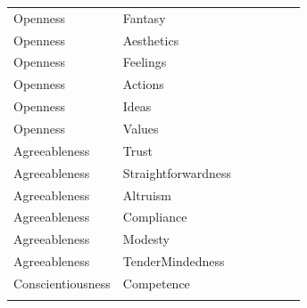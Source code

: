 \documentclass{article}\usepackage[]{graphicx}\usepackage[]{color}
\begin{document}
\begin{table}
\begin{tabular}[t]{lllllll}
Openness & Fantasy & \cellcolor{white}{0.4} & \cellcolor{white}{0.05} & \cellcolor{white}{-0.08} & \cellcolor{white}{0.06} & \cellcolor{yellow}{0.69}\\
Openness & Aesthetics & \cellcolor{white}{0.14} & \cellcolor{white}{0.25} & \cellcolor{white}{0.05} & \cellcolor{white}{0.16} & \cellcolor{yellow}{0.69}\\
Openness & Feelings & \cellcolor{yellow}{0.59} & \cellcolor{white}{0.3} & \cellcolor{white}{0.28} & \cellcolor{white}{-0.11} & \cellcolor{yellow}{0.57}\\
\addlinespace
Openness & Actions & \cellcolor{white}{0.43} & \cellcolor{white}{-0.05} & \cellcolor{white}{-0.12} & \cellcolor{white}{0.14} & \cellcolor{yellow}{0.61}\\
Openness & Ideas & \cellcolor{white}{0.13} & \cellcolor{white}{-0.1} & \cellcolor{white}{0.2} & \cellcolor{white}{-0.01} & \cellcolor{yellow}{0.66}\\
Openness & Values & \cellcolor{white}{0.34} & \cellcolor{white}{0.22} & \cellcolor{white}{0.06} & \cellcolor{white}{0.14} & \cellcolor{yellow}{0.65}\\
Agreeableness & Trust & \cellcolor{yellow}{0.54} & \cellcolor{white}{0.01} & \cellcolor{white}{0.26} & \cellcolor{white}{0.44} & \cellcolor{white}{0.28}\\
Agreeableness & Straightforwardness & \cellcolor{white}{0.22} & \cellcolor{white}{0.27} & \cellcolor{white}{0.38} & \cellcolor{yellow}{0.52} & \cellcolor{white}{0.08}\\
\addlinespace
Agreeableness & Altruism & \cellcolor{yellow}{0.71} & \cellcolor{white}{0.16} & \cellcolor{white}{0.44} & \cellcolor{white}{0.41} & \cellcolor{white}{0.35}\\
Agreeableness & Compliance & \cellcolor{white}{0.25} & \cellcolor{white}{0.16} & \cellcolor{white}{0.15} & \cellcolor{yellow}{0.76} & \cellcolor{white}{0.28}\\
Agreeableness & Modesty & \cellcolor{white}{0.17} & \cellcolor{white}{0.48} & \cellcolor{white}{0.21} & \cellcolor{white}{0.37} & \cellcolor{white}{0.14}\\
Agreeableness & TenderMindedness & \cellcolor{white}{0.45} & \cellcolor{white}{0.33} & \cellcolor{white}{0.16} & \cellcolor{white}{0.28} & \cellcolor{white}{0.47}\\
Conscientiousness & Competence & \cellcolor{white}{0.37} & \cellcolor{white}{-0.23} & \cellcolor{yellow}{0.77} & \cellcolor{white}{0.03} & \cellcolor{white}{0.2}\\
\addlinespace

\end{tabular}
\end{table}
\end{document}

